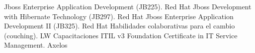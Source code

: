 %
%
%



\begin{scholarship}
					{Jboss Enterprise Application Development (JB225). Red Hat}
									{Jboss Development with Hibernate Technology (JB297). Red Hat}
									{Jboss Enterprise Application Development II (JB325). Red Hat}
									{Habilidades colaborativas para el cambio (couching). LW Capacitaciones}
									{ITIL v3 Foundation Certificate in IT Service Management. Axelos}
\end{scholarship}
